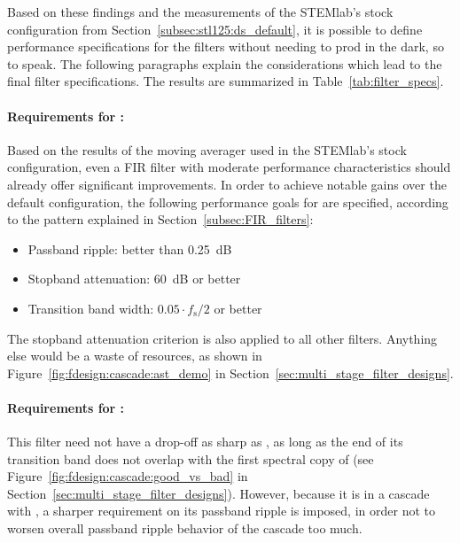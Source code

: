 Based  on  these  findings  and   the  measurements  of  the  STEMlab's  stock
configuration from  Section~\ref{subsec:stl125:ds_default}, it is  possible to
define performance specifications  for the filters without needing  to prod in
the dark,  so to  speak. The following  paragraphs explain  the considerations
which lead to  the final filter specifications. The results  are summarized in
Table~\ref{tab:filter_specs}.

\paragraph{Requirements  for   :}   Based   on  the   results  of
the  moving  averager   used  in  the  STEMlab's   stock  configuration,  even
a  FIR  filter  with   moderate  performance  characteristics  should  already
offer   significant   improvements. In   order  to   achieve   notable   gains
over  the   default  configuration,   the  following  performance   goals  for
   are  specified,   according  to   the  pattern   explained  in
Section~\ref{subsec:FIR_filters}:
\begin{itemize}\tightlist
    \item
        Passband ripple: better than \SI{0.25}{\dB}
    \item
        Stopband attenuation: \SI{60}{\dB} or better
    \item
        Transition band width: $0.05 \cdot f_\mathrm{s}/2$ or better
\end{itemize}
The     stopband    attenuation     criterion    is     also    applied     to
all    other     filters. Anything    else    would    be     a    waste    of
resources,   as   shown    in   Figure~\ref{fig:fdesign:cascade:ast_demo}   in
Section~\ref{sec:multi_stage_filter_designs}.

\paragraph{Requirements   for  :} This   filter   need  not   have
a   drop-off  as   sharp   as   ,  as   long   as   the  end   of
its   transition   band   does   not   overlap   with   the   first   spectral
copy  of   (see  Figure~\ref{fig:fdesign:cascade:good_vs_bad}  in
Section~\ref{sec:multi_stage_filter_designs}).   However, because  it is  in a
cascade with  , a sharper  requirement on its passband  ripple is
imposed,  in order  not  to worsen  overall passband  ripple  behavior of  the
cascade too much.

